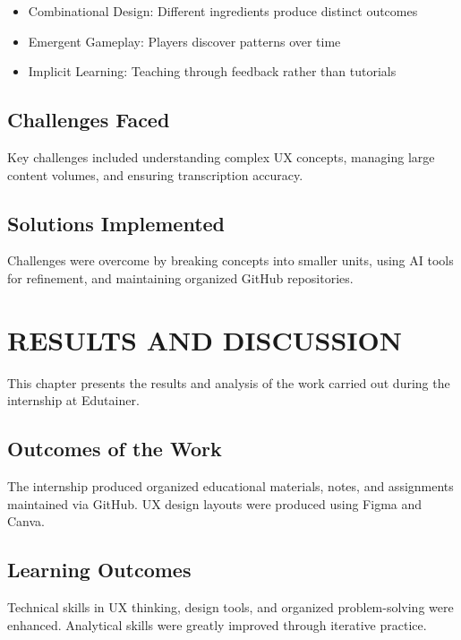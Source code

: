 \documentclass[12pt,a4paper]{report}
\begin{document}
\begin{itemize}[leftmargin=1.5em]
    \item Combinational Design: Different ingredients produce distinct outcomes
    \item Emergent Gameplay: Players discover patterns over time
    \item Implicit Learning: Teaching through feedback rather than tutorials
\end{itemize}



\section{Challenges Faced}

Key challenges included understanding complex UX concepts, managing large content volumes, and ensuring transcription accuracy.


\section{Solutions Implemented}

Challenges were overcome by breaking concepts into smaller units, using AI tools for refinement, and maintaining organized GitHub repositories.


\chapter{RESULTS AND DISCUSSION}


This chapter presents the results and analysis of the work carried out during the internship at Edutainer.




\section{Outcomes of the Work}

The internship produced organized educational materials, notes, and assignments maintained via GitHub. UX design layouts were produced using Figma and Canva.


\section{Learning Outcomes}

Technical skills in UX thinking, design tools, and organized problem-solving were enhanced. Analytical skills were greatly improved through iterative practice.
\end{document}
